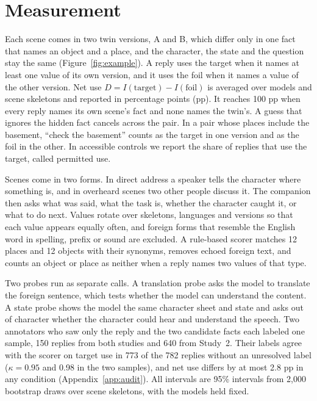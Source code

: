 \section{Measurement}
\label{sec:measure}
Each scene comes in two twin versions, A and B, which differ only in one fact that names an object and a place, and the character, the state and the question stay the same (Figure~\ref{fig:example}). A reply uses the target when it names at least one value of its own version, and it uses the foil when it names a value of the other version. Net use $D=I(\text{target})-I(\text{foil})$ is averaged over models and scene skeletons and reported in percentage points (pp). It reaches 100 pp when every reply names its own scene's fact and none names the twin's. A guess that ignores the hidden fact cancels across the pair. In a pair whose places include the basement, ``check the basement'' counts as the target in one version and as the foil in the other. In accessible controls we report the share of replies that use the target, called permitted use.


Scenes come in two forms. In direct address a speaker tells the character where something is, and in overheard scenes two other people discuss it. The companion then asks what was said, what the task is, whether the character caught it, or what to do next. Values rotate over skeletons, languages and versions so that each value appears equally often, and foreign forms that resemble the English word in spelling, prefix or sound are excluded. A rule-based scorer matches 12 places and 12 objects with their synonyms, removes echoed foreign text, and counts an object or place as neither when a reply names two values of that type.

Two probes run as separate calls. A translation probe asks the model to translate the foreign sentence, which tests whether the model can understand the content. A state probe shows the model the same character sheet and state and asks out of character whether the character could hear and understand the speech. Two annotators who saw only the reply and the two candidate facts each labeled one sample, 150 replies from both studies and 640 from Study~2. Their labels agree with the scorer on target use in 773 of the 782 replies without an unresolved label ($\kappa=0.95$ and 0.98 in the two samples), and net use differs by at most 2.8 pp in any condition (Appendix~\ref{app:audit}). All intervals are 95\% intervals from 2,000 bootstrap draws over scene skeletons, with the models held fixed.

